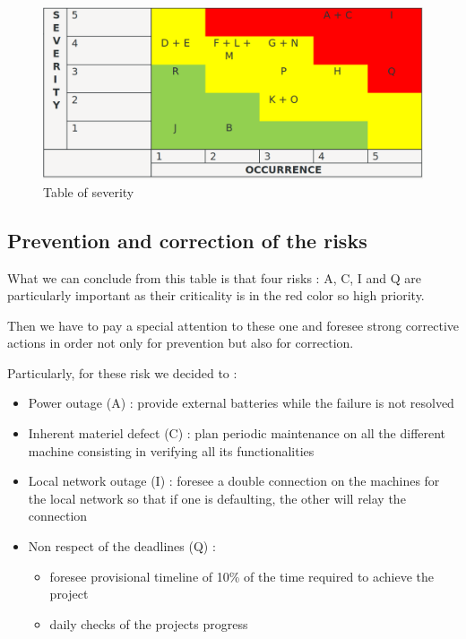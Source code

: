 \begin{figure}[h]
    \centering
    \includegraphics[scale=0.3]{Img/severity.png}
    \caption{Table of severity}
\end{figure}

\subsection{Prevention and correction of the risks}

What we can conclude from this table is that four risks : A, C, I and Q
are particularly important as their criticality is in the red color so
high priority.

Then we have to pay a special attention to these one and foresee strong
corrective actions in order not only for prevention but also for
correction.

Particularly, for these risk we decided to :

\begin{itemize}
\item
  Power outage (A) : provide external batteries while the failure is not
  resolved
\item
  Inherent materiel defect (C) : plan periodic maintenance on all the
  different machine consisting in verifying all its functionalities
\item
  Local network outage (I) : foresee a double connection on the machines
  for the local network so that if one is defaulting, the other will
  relay the connection
\item
  Non respect of the deadlines (Q) :

  \begin{itemize}
  \item
    foresee provisional timeline of 10\% of the time required to achieve
    the project
  \item
    daily checks of the projects progress
  \end{itemize}
\end{itemize}